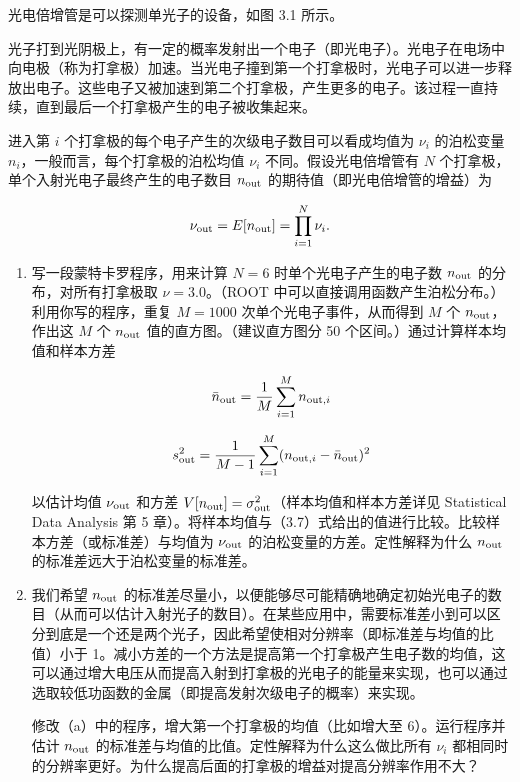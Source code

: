 \begin{question}
光电倍增管是可以探测单光子的设备，如图 3.1 所示。


光子打到光阴极上，有一定的概率发射出一个电子（即光电子）。光电子在电场中向电极（称为打拿极）加速。当光电子撞到第一个打拿极时，光电子可以进一步释放出电子。这些电子又被加速到第二个打拿极，产生更多的电子。该过程一直持续，直到最后一个打拿极产生的电子被收集起来。

进入第 \(i\) 个打拿极的每个电子产生的次级电子数目可以看成均值为
\(\nu_i\) 的泊松变量 \(n_i\)，一般而言，每个打拿极的泊松均值 \(\nu_i\)
不同。假设光电倍增管有 \(N\) 个打拿极，单个入射光电子最终产生的电子数目
\(n_{\rm out}\) 的期待值（即光电倍增管的增益）为

\[
\nu_{\rm out}=E[n_{\rm out}]=\prod_{i=1}^{N}\nu_i.
\]

\begin{enumerate}
\item 写一段蒙特卡罗程序，用来计算 \(N=6\) 时单个光电子产生的电子数
\(n_{\rm out}\) 的分布，对所有打拿极取 \(\nu=3.0\)。（ROOT
中可以直接调用函数产生泊松分布。）利用你写的程序，重复 \(M=1000\)
次单个光电子事件，从而得到 \(M\) 个 \(n_{\rm out}\)，作出这 \(M\) 个
\(n_{\rm out}\) 值的直方图。（建议直方图分 50
个区间。）通过计算样本均值和样本方差

\[
\bar n_{\rm out}=\frac{1}{M}\sum_{i=1}^{M}n_{{\rm out},i}
\]

\[
s_{\rm out}^2=\frac{1}{M-1}\sum_{i=1}^{M}(n_{{\rm out},i}-\bar n_{\rm out})^2
\]

以估计均值 \(\nu_{\rm out}\) 和方差
\(V[n_{\rm out}]=\sigma_{\rm out}^2\)（样本均值和样本方差详见
Statistical Data Analysis 第 5
章）。将样本均值与（3.7）式给出的值进行比较。比较样本方差（或标准差）与均值为
\(\nu_{\rm out}\) 的泊松变量的方差。定性解释为什么 \(n_{\rm out}\)
的标准差远大于泊松变量的标准差。

\item 我们希望 \(n_{\rm out}\)
的标准差尽量小，以便能够尽可能精确地确定初始光电子的数目（从而可以估计入射光子的数目）。在某些应用中，需要标准差小到可以区分到底是一个还是两个光子，因此希望使相对分辨率（即标准差与均值的比值）小于
1。减小方差的一个方法是提高第一个打拿极产生电子数的均值，这可以通过增大电压从而提高入射到打拿极的光电子的能量来实现，也可以通过选取较低功函数的金属（即提高发射次级电子的概率）来实现。

修改（a）中的程序，增大第一个打拿极的均值（比如增大至
6）。运行程序并估计 \(n_{\rm out}\)
的标准差与均值的比值。定性解释为什么这么做比所有 \(\nu_i\)
都相同时的分辨率更好。为什么提高后面的打拿极的增益对提高分辨率作用不大？


\end{enumerate}
\end{question}
